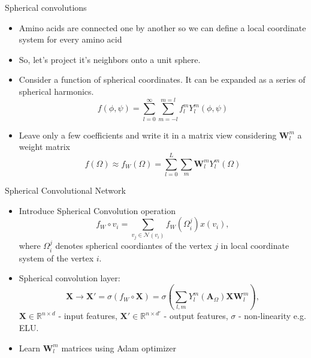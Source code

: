 \documentclass{beamer}
\begin{document}
\begin{frame}{Spherical convolutions}
        \begin{itemize}
            \item Amino acids are connected one by another so we can define a local coordinate system for every amino acid
            \item So, let's project it's neighbors onto a unit sphere.
            \item Consider a function of spherical coordinates. It can be expanded as a series of spherical harmonics.
             $$f(\phi, \psi) = \sum_{l = 0}^{\infty} \sum_{m=-l}^{m=l}f_l^m Y_l^m(\phi, \psi)$$
            \item Leave only a few coefficients and write it in a matrix view considering $\boldsymbol{W}_l^m$ a weight matrix
            $$f(\Omega) \approx f_W(\Omega) = \sum_{l=0}^{L}\sum_m \boldsymbol{W}_l^m Y_l^m(\Omega)$$
        \end{itemize}
\end{frame}
\begin{frame}{Spherical Convolutional Network}
        \begin{itemize}
            \item Introduce Spherical Convolution operation
            $$f_W \circ v_i = \sum_{v_j \in \mathcal{N}(v_i)} f_W(\Omega_i^j)x(v_i),$$
            where $\Omega_i^j$ denotes spherical coordiantes of the vertex $j$ in local coordinate system of the vertex $i$.
            \item Spherical convolution layer: $$\boldsymbol{X} \longrightarrow \boldsymbol{X}' = \sigma(f_W \circ \boldsymbol{X}) = \sigma\left(\sum_{l,m}Y_l^m(\boldsymbol{A}_\Omega)\boldsymbol{X}\boldsymbol{W}_l^m\right),$$
            $\boldsymbol{X} \in \mathbb{R}^{n\times d}$ - input features, $\boldsymbol{X}' \in \mathbb{R}^{n\times d'}$ - output features, $\sigma$ - non-linearity e.g. ELU.
            \item Learn $\boldsymbol{W}_l^m$ matrices using Adam optimizer
        \end{itemize}
\end{frame}
\end{document}
